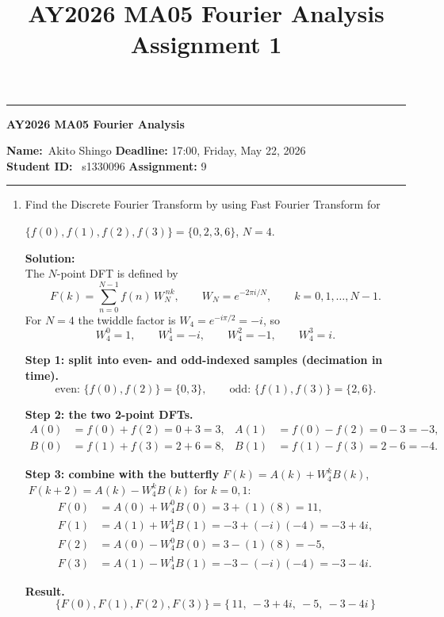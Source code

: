 \documentclass[12pt]{scrartcl}
\title{AY2026 MA05 Fourier Analysis Assignment 1}
\begin{document}
\begin{center}
    \hrule
    \vspace{.4cm}
    {\textbf { \large AY2026 MA05 Fourier Analysis}}
\end{center}
{\textbf{Name:}\ Akito Shingo \hspace{\fill} \textbf{Deadline:} 17:00, Friday, May 22, 2026   \\
{ \textbf{Student ID:}} \ s1330096 \hspace{\fill} \textbf{Assignment:} 9 \\}
    \hrule

\begin{enumerate}

\item
Find the Discrete Fourier Transform by using Fast Fourier Transform for

$\{f(0),f(1),f(2),f(3)\}=\{0, 2, 3, 6\}$, $N=4$.

\textbf{Solution:} \\

The $N$-point DFT is defined by
\[
F(k)=\sum_{n=0}^{N-1} f(n)\,W_N^{\,nk},
\qquad W_N=e^{-2\pi i/N},\qquad k=0,1,\dots,N-1 .
\]
For $N=4$ the twiddle factor is $W_4=e^{-i\pi/2}=-i$, so
\[
W_4^{0}=1,\qquad W_4^{1}=-i,\qquad W_4^{2}=-1,\qquad W_4^{3}=i .
\]

\textbf{Step 1: split into even- and odd-indexed samples (decimation in time).}
\[
\text{even: }\{f(0),f(2)\}=\{0,3\},\qquad
\text{odd: }\{f(1),f(3)\}=\{2,6\}.
\]

\textbf{Step 2: the two 2-point DFTs.}
\begin{align*}
A(0)&=f(0)+f(2)=0+3=3, & A(1)&=f(0)-f(2)=0-3=-3,\\
B(0)&=f(1)+f(3)=2+6=8, & B(1)&=f(1)-f(3)=2-6=-4.
\end{align*}

\textbf{Step 3: combine with the butterfly} $F(k)=A(k)+W_4^{k}B(k)$,
$\;F(k+2)=A(k)-W_4^{k}B(k)$ for $k=0,1$:
\begin{align*}
F(0)&=A(0)+W_4^{0}B(0)=3+(1)(8)=11,\\
F(1)&=A(1)+W_4^{1}B(1)=-3+(-i)(-4)=-3+4i,\\
F(2)&=A(0)-W_4^{0}B(0)=3-(1)(8)=-5,\\
F(3)&=A(1)-W_4^{1}B(1)=-3-(-i)(-4)=-3-4i.
\end{align*}

\textbf{Result.}
\[
\boxed{\{F(0),F(1),F(2),F(3)\}=\{\,11,\ -3+4i,\ -5,\ -3-4i\,\}}
\]


\end{enumerate}
\end{document}

